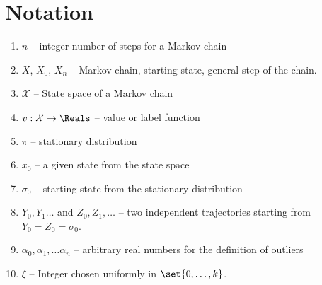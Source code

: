 \documentclass[12pt]{article}
\begin{document}
\section*{Notation}
\begin{enumerate}
\item \( n \) -- integer number of steps for a Markov chain
    \item
        \( X \), \( X_0 \), \( X_n \) -- Markov chain, starting state,
        general step of the chain.
    \item
        \( \mathcal{X} \) -- State space of a Markov chain
    \item
        \( v :  \mathcal{X} \to \Reals \) -- value or label function
    \item
        \( \pi \) -- stationary distribution
    \item
        \( x_0 \) -- a given state from the state space
      \item $\sigma_0$ -- starting state from the stationary
        distribution
      \item
            \( Y_0 , Y_1 \dots \) and \(
            Z_0, Z_1, \dots \) -- two independent trajectories  starting from \( Y_0 = Z_0 = \sigma_0 \).

    \item
        \( \alpha_0, \alpha_1, \dots \alpha_n \) -- arbitrary real
        numbers for the definition of outliers
      \item   \( \xi \) -- Integer chosen uniformly in \( \set{0,\dots, k}
            \).


\end{enumerate}
\end{document}

